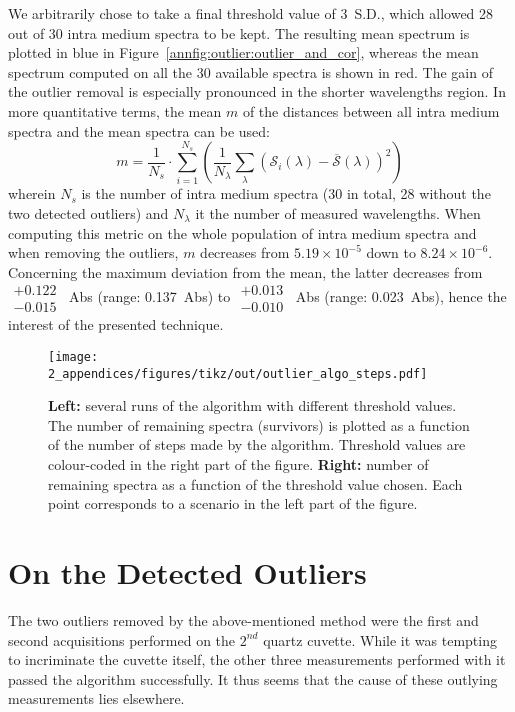 We arbitrarily chose to take a final threshold value of 3~S.D., which allowed 28 out of 30 intra medium spectra to be kept. The resulting mean spectrum is plotted in blue in Figure~\ref{annfig:outlier:outlier_and_cor}, whereas the mean spectrum computed on all the 30 available spectra is shown in red. The gain of the outlier removal is especially pronounced in the shorter wavelengths region. In more quantitative terms, the mean $m$ of the distances between all intra medium spectra and the mean spectra can be used:
\begin{equation}
	m = \frac{1}{N_s}\cdot \sum_{i=1}^{N_s} \left( \frac{1}{N_{\lambda}} \sum_{\lambda}^{} \left( \mathcal{S}_i(\lambda) - \overline{\mathcal{S}}(\lambda) \right) ^2 \right)
\end{equation}
wherein $N_s$ is the number of intra medium spectra (30 in total, 28 without the two detected outliers) and $N_{\lambda}$ it the number of measured wavelengths. When computing this metric on the whole population of intra medium spectra and when removing the outliers, $m$ decreases from $5.19\times 10^{-5}$ down to $8.24\times 10^{-6}$. Concerning the maximum deviation from the mean, the latter decreases from $\substack{+0.122 \\ -0.015}$~Abs (range: 0.137~Abs) to $\substack{+0.013 \\ -0.010}$~Abs (range: 0.023~Abs), hence the interest of the presented technique.

\begin{figure}
	\centering
	\texttt{[image: 2\_appendices/figures/tikz/out/outlier\_algo\_steps.pdf]}
	\caption[Epoch-based view of the outlier removing algorithm.]{\textbf{Left:} several runs of the algorithm with different threshold values. The number of remaining spectra (survivors) is plotted as a function of the number of steps made by the algorithm. Threshold values are colour-coded in the right part of the figure. \textbf{Right:} number of remaining spectra as a function of the threshold value chosen. Each point corresponds to a scenario in the left part of the figure.}
	\label{annfig:outlier:outlier_algo_steps}
\end{figure}

\section{On the Detected Outliers}\label{annsect:outliers:outliers_discuss}

The two outliers removed by the above-mentioned method were the first and second acquisitions performed on the $2^{nd}$ quartz cuvette. While it was tempting to incriminate the cuvette itself, the other three measurements performed with it passed the algorithm successfully. It thus seems that the cause of these outlying measurements lies elsewhere.

